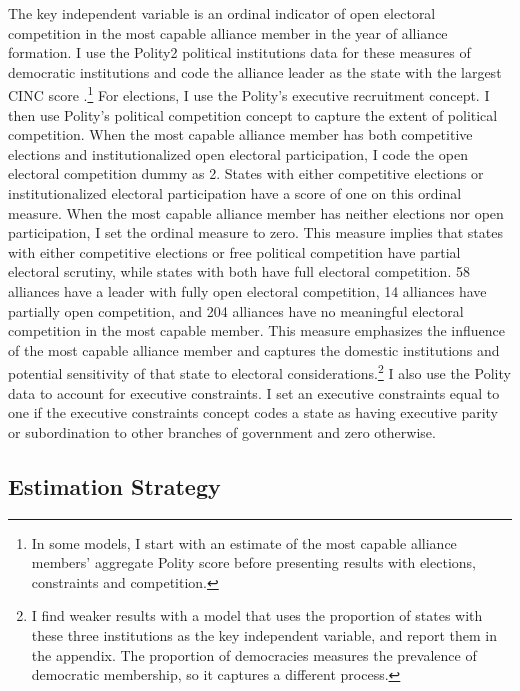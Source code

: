 \documentclass[12pt]{article}
\begin{document}
The key independent variable is an ordinal indicator of open electoral competition in the most capable alliance member in the year of alliance formation. 
I use the Polity2 political institutions data for these measures of democratic institutions and code the alliance leader as the state with the largest CINC score \citep{SingerCINC1988}.\footnote{In some models, I start with an estimate of the most capable alliance members' aggregate Polity score before presenting results with elections, constraints and competition.}
For elections, I use the Polity's executive recruitment concept. 
I then use Polity's political competition concept to capture the extent of political competition. 
When the most capable alliance member has both competitive elections and institutionalized open electoral participation, I code the open electoral competition dummy as 2.
States with either competitive elections or institutionalized electoral participation have a score of one on this ordinal measure. 
When the most capable alliance member has neither elections nor open participation, I set the ordinal measure to zero.
This measure implies that states with either competitive elections or free political competition have partial electoral scrutiny, while states with both have full electoral competition. 
58 alliances have a leader with fully open electoral competition, 14 alliances have partially open competition, and 204 alliances have no meaningful electoral competition in the most capable member. 
This measure emphasizes the influence of the most capable alliance member and captures the domestic institutions and potential sensitivity of that state to electoral considerations.\footnote{I find weaker results with a model that uses the proportion of states with these three institutions as the key independent variable, and report them in the appendix. The proportion of democracies measures the prevalence of democratic membership, so it captures a different process.}    
I also use the Polity data to account for executive constraints.
I set an executive constraints equal to one if the executive constraints concept codes a state as having executive parity or subordination to other branches of government and zero otherwise.



\subsection{Estimation Strategy}
\end{document}
